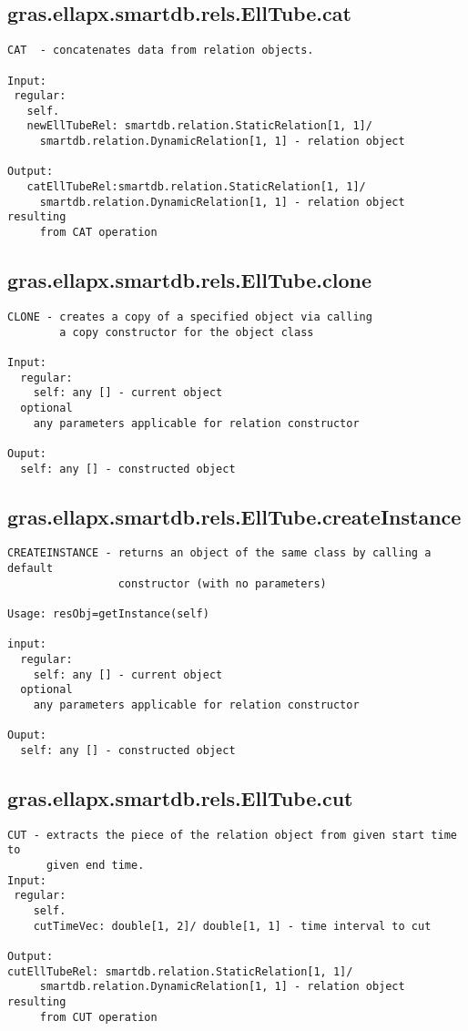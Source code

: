 \subsection{\texorpdfstring{gras.ellapx.smartdb.rels.EllTube.cat}{cat}}\label{method:gras.ellapx.smartdb.rels.EllTube.cat}
\begin{verbatim}
CAT  - concatenates data from relation objects.

Input:
 regular:
   self.
   newEllTubeRel: smartdb.relation.StaticRelation[1, 1]/
     smartdb.relation.DynamicRelation[1, 1] - relation object

Output:
   catEllTubeRel:smartdb.relation.StaticRelation[1, 1]/
     smartdb.relation.DynamicRelation[1, 1] - relation object resulting
     from CAT operation
\end{verbatim}
\subsection{\texorpdfstring{gras.ellapx.smartdb.rels.EllTube.clone}{clone}}\label{method:gras.ellapx.smartdb.rels.EllTube.clone}
\begin{verbatim}
CLONE - creates a copy of a specified object via calling
        a copy constructor for the object class

Input:
  regular:
    self: any [] - current object
  optional
    any parameters applicable for relation constructor

Ouput:
  self: any [] - constructed object
\end{verbatim}
\subsection{\texorpdfstring{gras.ellapx.smartdb.rels.EllTube.createInstance}{createInstance}}\label{method:gras.ellapx.smartdb.rels.EllTube.createInstance}
\begin{verbatim}
CREATEINSTANCE - returns an object of the same class by calling a default
                 constructor (with no parameters)

Usage: resObj=getInstance(self)

input:
  regular:
    self: any [] - current object
  optional
    any parameters applicable for relation constructor

Ouput:
  self: any [] - constructed object
\end{verbatim}
\subsection{\texorpdfstring{gras.ellapx.smartdb.rels.EllTube.cut}{cut}}\label{method:gras.ellapx.smartdb.rels.EllTube.cut}
\begin{verbatim}
CUT - extracts the piece of the relation object from given start time to
      given end time.
Input:
 regular:
    self.
    cutTimeVec: double[1, 2]/ double[1, 1] - time interval to cut

Output:
cutEllTubeRel: smartdb.relation.StaticRelation[1, 1]/
     smartdb.relation.DynamicRelation[1, 1] - relation object resulting
     from CUT operation
\end{verbatim}
